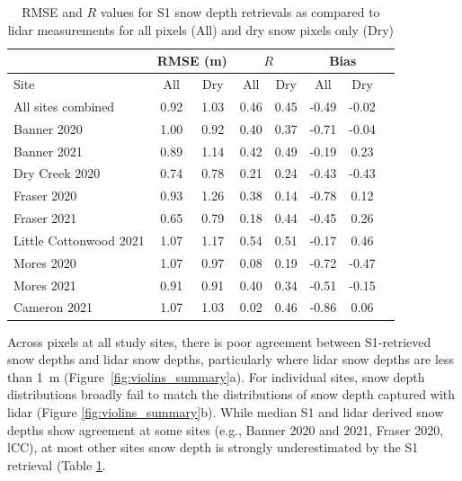\documentclass[journal abbreviation, manuscript]{copernicus}
\begin{document}
\begin{table}[htbp]
\caption{RMSE and $R$ values for S1 snow depth retrievals as compared to lidar measurements for all pixels (All) and dry snow pixels only (Dry)}
\label{table:results}
\begin{tabular}{|l|cc|cc|cc|c|}
\hline
 & \multicolumn{2}{c|}{RMSE (m)} & \multicolumn{2}{c|}{$R$} & \multicolumn{2}{c|}{Bias} \\
\hline
Site & All & Dry  & All & Dry  & All & Dry  \\
\hline
All sites combined & 0.92 & 1.03 & 0.46 & 0.45 & -0.49 & -0.02 \\
\hline %
Banner 2020 & 1.00 & 0.92 & 0.40 & 0.37 & -0.71 & -0.04 \\
Banner 2021 & 0.89 & 1.14 & 0.42 & 0.49 & -0.19 & 0.23 \\
Dry Creek 2020 & 0.74 & 0.78 & 0.21 & 0.24 & -0.43 & -0.43\\
Fraser 2020 & 0.93 & 1.26 & 0.38 & 0.14 & -0.78 & 0.12\\
Fraser 2021 & 0.65 & 0.79 & 0.18 & 0.44 & -0.45 & 0.26\\
Little Cottonwood 2021 & 1.07 & 1.17 & 0.54 & 0.51 & -0.17 & 0.46\\
Mores 2020 & 1.07 & 0.97 & 0.08 & 0.19 & -0.72 & -0.47\\
Mores 2021 & 0.91 & 0.91 & 0.40 & 0.34 & -0.51 & -0.15\\
Cameron 2021 & 1.07 & 1.03 & 0.02 & 0.46 & -0.86 & 0.06\\
\hline
\end{tabular}
\end{table}
\clearpage

Across pixels at all study sites, there is poor agreement between S1-retrieved snow depths and lidar snow depths, particularly where lidar snow depths are less than 1~m  (Figure~\ref{fig:violins_summary}a). For individual sites, snow depth distributions broadly fail to match the distributions of snow depth captured with lidar (Figure \ref{fig:violins_summary}b). While median S1 and lidar derived snow depths show agreement at some sites (e.g., Banner 2020 and 2021, Fraser 2020, lCC), at most other sites snow depth is strongly underestimated by the S1 retrieval (Table \ref{table:results}.
\end{document}
